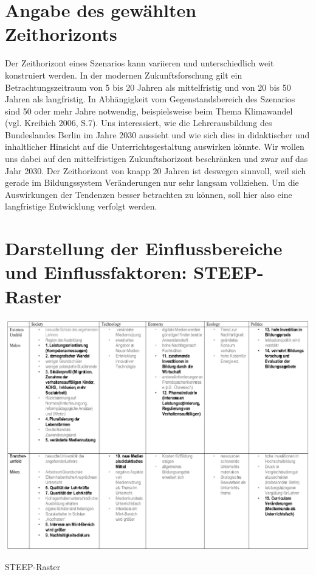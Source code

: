 \documentclass[12pt,a4paper]{article}
\begin{document}
\section{Angabe des gewählten Zeithorizonts} 
Der Zeithorizont eines Szenarios kann variieren und unterschiedlich weit konstruiert werden. In der modernen Zukunftsforschung gilt ein Betrachtungszeitraum von 5 bis 20 Jahren als mittelfristig und von 20 bis 50 Jahren als langfristig. In Abhängigkeit vom Gegenstandsbereich des Szenarios sind 50 oder mehr Jahre notwendig, beispielsweise beim Thema Klimawandel (vgl. Kreibich 2006, S.7)\cite{Kreibich2006}.
Uns interessiert, wie die Lehrerausbildung des Bundeslandes Berlin im Jahre 2030 aussieht und wie sich dies in didaktischer und inhaltlicher Hinsicht auf die Unterrichtsgestaltung auswirken könnte. Wir wollen uns dabei auf den mittelfristigen Zukunftshorizont beschränken und zwar auf das Jahr 2030. Der Zeithorizont von knapp 20 Jahren ist deswegen sinnvoll, weil sich gerade im Bildungssystem Veränderungen nur sehr langsam vollziehen. Um die Auswirkungen der Tendenzen besser betrachten zu können, soll hier also eine langfristige Entwicklung verfolgt werden.

\section{Darstellung der Einflussbereiche und Einflussfaktoren: STEEP-Raster}
\begin{table}[!ht]
\includegraphics[scale=0.72,angle=90]{pic1.pdf}
\caption{STEEP-Raster}
\label{steep}
\end{table}
\end{document}
